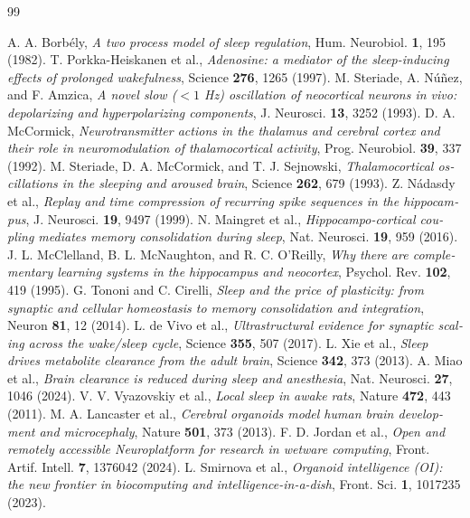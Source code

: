 \begin{thebibliography}{99}
\begin{otherlanguage}{english}
 A. A. Borb\'ely, \emph{A two process model of sleep regulation}, Hum. Neurobiol. \textbf{1}, 195 (1982).
 T. Porkka-Heiskanen et al., \emph{Adenosine: a mediator of the sleep-inducing effects of prolonged wakefulness}, Science \textbf{276}, 1265 (1997).
 M. Steriade, A. N\'u\~nez, and F. Amzica, \emph{A novel slow ($<1$ Hz) oscillation of neocortical neurons in vivo: depolarizing and hyperpolarizing components}, J. Neurosci. \textbf{13}, 3252 (1993).
 D. A. McCormick, \emph{Neurotransmitter actions in the thalamus and cerebral cortex and their role in neuromodulation of thalamocortical activity}, Prog. Neurobiol. \textbf{39}, 337 (1992).
 M. Steriade, D. A. McCormick, and T. J. Sejnowski, \emph{Thalamocortical oscillations in the sleeping and aroused brain}, Science \textbf{262}, 679 (1993).
 Z. N\'adasdy et al., \emph{Replay and time compression of recurring spike sequences in the hippocampus}, J. Neurosci. \textbf{19}, 9497 (1999).
 N. Maingret et al., \emph{Hippocampo-cortical coupling mediates memory consolidation during sleep}, Nat. Neurosci. \textbf{19}, 959 (2016).
 J. L. McClelland, B. L. McNaughton, and R. C. O'Reilly, \emph{Why there are complementary learning systems in the hippocampus and neocortex}, Psychol. Rev. \textbf{102}, 419 (1995).
 G. Tononi and C. Cirelli, \emph{Sleep and the price of plasticity: from synaptic and cellular homeostasis to memory consolidation and integration}, Neuron \textbf{81}, 12 (2014).
 L. de Vivo et al., \emph{Ultrastructural evidence for synaptic scaling across the wake/sleep cycle}, Science \textbf{355}, 507 (2017).
 L. Xie et al., \emph{Sleep drives metabolite clearance from the adult brain}, Science \textbf{342}, 373 (2013).
 A. Miao et al., \emph{Brain clearance is reduced during sleep and anesthesia}, Nat. Neurosci. \textbf{27}, 1046 (2024).
 V. V. Vyazovskiy et al., \emph{Local sleep in awake rats}, Nature \textbf{472}, 443 (2011).
 M. A. Lancaster et al., \emph{Cerebral organoids model human brain development and microcephaly}, Nature \textbf{501}, 373 (2013).
 F. D. Jordan et al., \emph{Open and remotely accessible Neuroplatform for research in wetware computing}, Front. Artif. Intell. \textbf{7}, 1376042 (2024).
 L. Smirnova et al., \emph{Organoid intelligence (OI): the new frontier in biocomputing and intelligence-in-a-dish}, Front. Sci. \textbf{1}, 1017235 (2023).

\end{otherlanguage}
\end{thebibliography}
